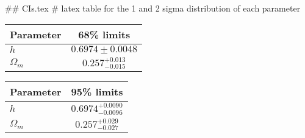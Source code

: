 ## CIs.tex
# latex table for the 1 and 2 sigma distribution of each parameter

\begin{tabular} { l  c}
 Parameter &  68\% limits\\
\hline
{\boldmath$h              $} & $0.6974\pm 0.0048          $\\
{\boldmath$\Omega_m       $} & $0.257^{+0.013}_{-0.015}   $\\
\hline
\end{tabular}

\begin{tabular} { l  c}
 Parameter &  95\% limits\\
\hline
{\boldmath$h              $} & $0.6974^{+0.0090}_{-0.0096}$\\
{\boldmath$\Omega_m       $} & $0.257^{+0.029}_{-0.027}   $\\
\hline
\end{tabular}
